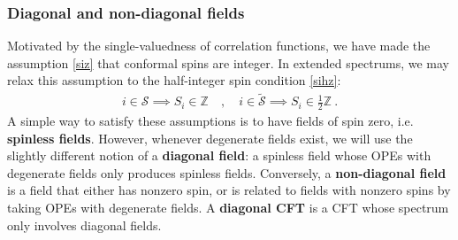 \documentclass[12pt, a4paper]{article}
\theoremstyle{break}
\begin{document}
\subsubsection{Diagonal and non-diagonal fields}

Motivated by the single-valuedness of correlation functions, we have made the assumption \eqref{siz} that conformal spins are integer. In extended spectrums, we may relax this assumption to the half-integer spin condition \eqref{sihz}:
\begin{align}
 i\in\mathcal{S}\implies S_i\in\mathbb{Z} \quad , \quad i \in \widetilde{\mathcal{S}}\implies S_i\in\frac12\mathbb{Z}\ . 
\end{align}
A simple way to satisfy these assumptions is to have fields of spin zero, i.e. \textbf{spinless fields}. However, whenever degenerate fields exist, we will use the slightly different notion of a \textbf{diagonal field}: a spinless field whose OPEs with degenerate fields only produces spinless fields. Conversely, a \textbf{non-diagonal field} is a field that either has nonzero spin, or is related to fields with nonzero spins by taking OPEs with degenerate fields. A \textbf{diagonal CFT} is a CFT whose spectrum only involves diagonal fields.  
\end{document}

